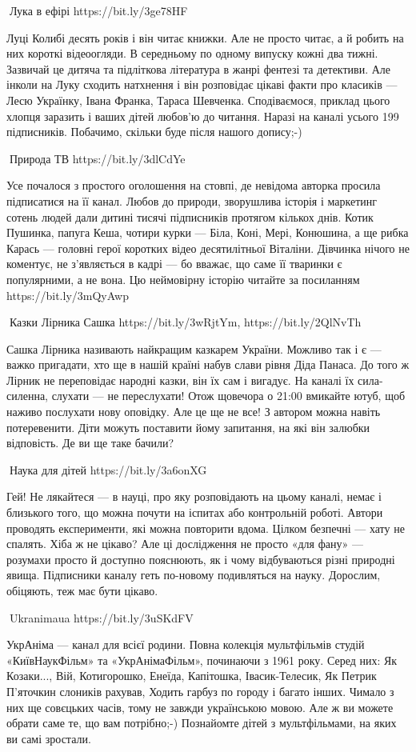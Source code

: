 🦉Лука в ефірі https://bit.ly/3ge78HF 

Луці Колибі десять років і він читає книжки. Але не просто читає, а й робить на них короткі відеоогляди. В середньому по одному випуску кожні два тижні. Зазвичай це дитяча та підліткова література в жанрі фентезі та детективи. Але інколи на Луку сходить натхнення і він розповідає цікаві факти про класиків — Лесю Українку, Івана Франка, Тараса Шевченка. Сподіваємося, приклад цього хлопця заразить і ваших дітей любов’ю до читання. Наразі на каналі усього 199 підписників. Побачимо, скільки буде після нашого допису;-)

🦉Природа ТВ https://bit.ly/3dlCdYe

Усе почалося з простого оголошення на стовпі, де невідома авторка просила підписатися на її канал. Любов до природи, зворушлива історія і маркетинг сотень людей дали дитині тисячі підписників протягом кількох днів. Котик Пушинка, папуга Кеша, чотири курки — Біла, Коні, Мері, Конюшина, а ще рибка Карась — головні герої коротких відео десятилітньої Віталіни. Дівчинка нічого не коментує, не з’являється в кадрі — бо вважає, що саме її тваринки є популярними, а не вона. Цю неймовірну історію читайте за посиланням https://bit.ly/3mQyAwp

🦉Казки Лірника Сашка https://bit.ly/3wRjtYm, https://bit.ly/2QlNvTh

Сашка Лірника називають найкращим казкарем України. Можливо так і є — важко пригадати, хто ще в нашій країні набув слави рівня Діда Панаса. До того ж Лірник не переповідає народні казки, він їх сам і вигадує. На каналі їх сила-силенна, слухати  — не переслухати! Отож щовечора о 21:00 вмикайте ютуб, щоб наживо послухати нову оповідку. Але це ще не все! З автором можна навіть потеревенити. Діти можуть поставити йому запитання, на які він залюбки відповість. Де ви ще таке бачили?

🦉Наука для дітей https://bit.ly/3a6onXG

Гей! Не лякайтеся — в науці, про яку розповідають на цьому каналі, немає і близького того, що можна почути на іспитах або контрольній роботі. Автори проводять експерименти, які можна повторити вдома. Цілком безпечні — хату не спалять. Хіба ж не цікаво? Але ці дослідження не просто «для фану» — розумахи просто й доступно пояснюють, як і чому відбуваються різні природні явища. Підписники каналу геть по-новому подивляться на науку. Дорослим, обіцяють, теж має бути цікаво.

🦉Ukranimaua https://bit.ly/3uSKdFV

УкрАніма — канал для всієї родини. Повна колекція мультфільмів студій «КиївНаукФільм» та «УкрАнімаФільм», починаючи з 1961 року. Серед них: Як Козаки..., Вій, Котигорошко, Енеїда, Капітошка, Івасик-Телесик, Як Петрик П'яточкин слоників рахував, Ходить гарбуз по городу і багато інших. Чимало з них ще совєцьких часів, тому не завжди українською мовою. Але ж ви можете обрати саме те, що вам потрібно;-) Познайомте дітей з мультфільмами, на яких ви самі зростали.

